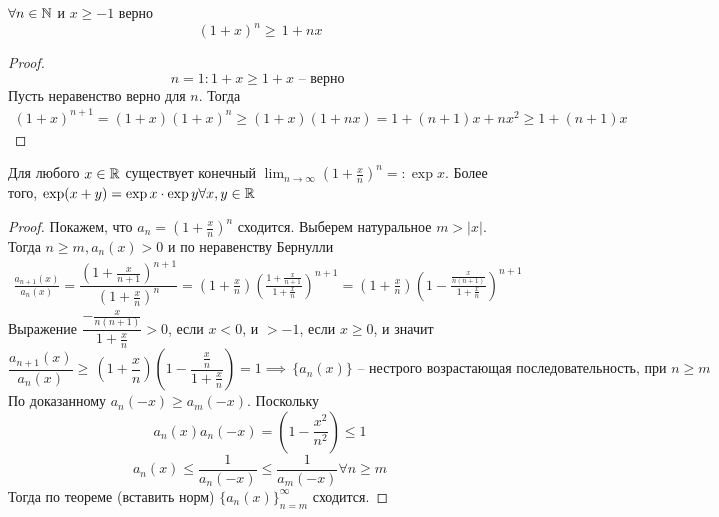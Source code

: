 \begin{lemma}
    $ \forall n \in \mathbb{N} $ и $ x \geq - 1 $ верно \begin{equation}
        (1 + x)^ n \geq\, 1 + nx
    \end{equation}
\end{lemma} \begin{proof}
    \begin{equation}
    n = 1: 1 + x \geq 1 + x \text{ -- верно }
   \end{equation}
   Пусть неравенство верно для $ n $. Тогда \begin{multline}
    (1 + x)^{n + 1} = (1 + x)(1 + x)^ n \geq (1 + x)(1 + nx) = 1 + (n + 1)x + nx^2 \geq 1 + (n + 1)x
   \end{multline}
\end{proof}
\begin{theorem}
    Для любого $ x \in \mathbb{R} $ существует конечный $ \lim_{n \to \infty}\left(1 + \frac{x}{n}\right)^n = : \exp x $.
    Более того, $ \exp(x + y) = \exp x \cdot \exp y \forall x, y \in \mathbb{R} $
\end{theorem} \begin{proof}
    Покажем, что $ a_n = (1 + \frac{x}{n})^ n $ сходится. Выберем натуральное $ m > |x| $. Тогда $ n \geq  m, a_n(x) > 0 $ и по неравенству Бернулли \begin{multline}
        \frac{a_{n + 1}(x)}{a_n(x)} = \dfrac{(1 + \frac{x}{n + 1})^{n + 1}}{(1 + \frac{x}{n})^n} = (1 + \frac{x}{n})(\frac{1 + \frac{x}{n + 1}}{1 + \frac{x}{n}})^{n + 1} = (1 + \frac{x}{n})(1 - \frac{\frac{x}{n(n + 1)}}{1 + \frac{x}{n}})^{n + 1}
    \end{multline}
    Выражение $ \dfrac{ - \frac{x}{n(n + 1)}}{1 + \frac{x}{n}} > 0 $, если $ x < 0 $, и $ > - 1 $, если $ x \geq 0 $, и значит \begin{equation}
        \frac{a_{n + 1}(x)}{a_n(x)} \geq\, (1 + \frac{x}{n})(1 - \frac{\frac{x}{n}}{1 + \frac{x}{n}}) = 1 \implies\, \{a_n(x)\} \text{ -- нестрого возрастающая последовательность, при } n \geq m 
    \end{equation}
    По доказанному $ a_n( - x) \geq  a_m( - x) $. Поскольку \begin{equation}
        a_n(x)a_n( - x) = \left(1 - \frac{x^2}{n^2}\right) \leq 1
    \end{equation}
    \begin{equation}
    a_n(x) \leq \frac{1}{a_n( - x)} \leq \frac{1}{a_m( - x)} \forall n \geq m
   \end{equation}
   Тогда по теореме (вставить норм) $ \{a_n(x)\}_{n = m}^ \infty $ сходится.

\end{proof}
